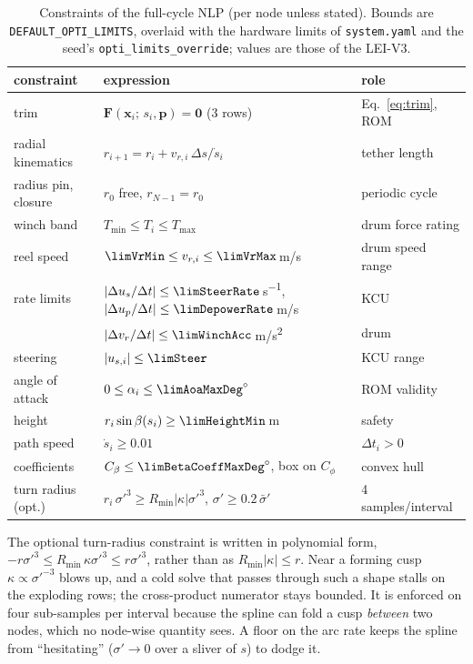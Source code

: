 \documentclass[11pt,a4paper]{article}
\newcommand{\code}[1]{\texttt{\small #1}}
\newcommand{\vect}[1]{\boldsymbol{#1}}
\begin{document}
\begin{table}[H]
  \centering\small
  \caption{Constraints of the full-cycle NLP (per node unless stated). Bounds
  are \code{DEFAULT\_OPTI\_LIMITS}, overlaid with the hardware limits of
  \code{system.yaml} and the seed's \code{opti\_limits\_override}; values are
  those of the LEI-V3.}
  \label{tab:constraints}
  \begin{tabular}{lll}
    \toprule
    constraint & expression & role \\
    \midrule
    trim & $\vect F(\vect x_i;\,s_i,\vect p)=\vect 0$ (3 rows) & Eq.~\eqref{eq:trim}, ROM \\
    radial kinematics & $r_{i+1}=r_i+v_{r,i}\,\Delta s/\dot s_i$ & tether length \\
    radius pin, closure & $r_0$ free, $r_{N-1}=r_0$ & periodic cycle \\
    winch band & $T_{\min}\le T_i\le T_{\max}$ & drum force rating \\
    reel speed & $\limVrMin\le v_{r,i}\le\limVrMax$\,\si{m/s} & drum speed range \\
    rate limits & $|\Delta u_s/\Delta t|\le\limSteerRate$\,\si{s^{-1}},
      $|\Delta u_p/\Delta t|\le\limDepowerRate$\,\si{m/s} & KCU \\
     & $|\Delta v_r/\Delta t|\le\limWinchAcc$\,\si{m/s^2} & drum \\
    steering & $|u_{s,i}|\le\limSteer$ & KCU range \\
    angle of attack & $0\le\alpha_i\le\limAoaMaxDeg^\circ$ & ROM validity \\
    height & $r_i\sin\beta(s_i)\ge\limHeightMin$\,\si{m} & safety \\
    path speed & $\dot s_i\ge 0.01$ & $\Delta t_i>0$ \\
    coefficients & $C_\beta\le\limBetaCoeffMaxDeg^\circ$, box on $C_\phi$ & convex hull \\
    turn radius (opt.) & $r_i\,\sigma'^3\ge R_{\min}|\kappa|\sigma'^3$, $\sigma'\ge0.2\,\bar\sigma'$ & 4 samples/interval \\
    \bottomrule
  \end{tabular}
\end{table}

The optional turn-radius constraint is written in polynomial form,
$-r\sigma'^3\le R_{\min}\,\kappa\sigma'^3\le r\sigma'^3$, rather than as
$R_{\min}|\kappa|\le r$. Near a forming cusp $\kappa\propto\sigma'^{-3}$ blows
up, and a cold solve that passes through such a shape stalls on the exploding
rows; the cross-product numerator stays bounded. It is enforced on four
sub-samples per interval because the spline can fold a cusp \emph{between}
two nodes, which no node-wise quantity sees. A floor on the arc rate keeps the
spline from ``hesitating'' ($\sigma'\to0$ over a sliver of $s$) to dodge it.
\end{document}
